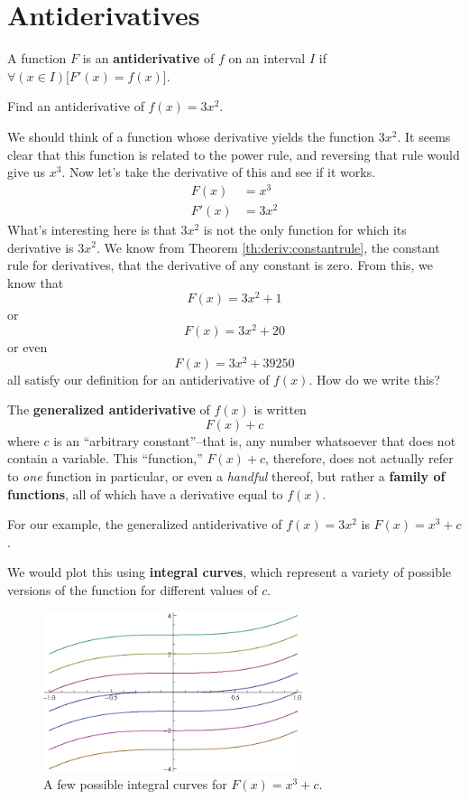 \section{Antiderivatives}
\begin{defn}
  A function $F$ is an \textbf{antiderivative} of $f$ on an interval $I$ if $\forall (x \in I) \big[F'(x)=f(x)\big]$.
\end{defn}
\begin{ex}
  Find an antiderivative of $f(x)=3x^2$.
  \begin{sol}
    We should think of a function whose derivative yields the function $3x^2$.
    It seems clear that this function is related to the power rule, and reversing that rule would give us $x^3$.
    Now let's take the derivative of this and see if it works.
    \begin{align*}
      F(x)&=x^3 \\
      F'(x) &= 3x^2
    \end{align*}
    What's interesting here is that $3x^2$ is not the only function for which its derivative is $3x^2$.
    We know from Theorem \ref{th:deriv:constantrule}, the constant rule for derivatives, that the derivative of any constant is zero.
    From this, we know that
    \[ F(x)=3x^2+1 \]
    or
    \[ F(x)=3x^2+20\]
    or even
    \[ F(x)=3x^2+39250\]
    all satisfy our definition for an antiderivative of $f(x)$.
    How do we write this?

    The \textbf{generalized antiderivative} of $f(x)$ is written
    \[ F(x)+c \]
    where $c$ is an ``arbitrary constant''--that is, any number whatsoever that does not contain a variable.
    This ``function,'' $F(x)+c$, therefore, does not actually refer to \emph{one} function in particular,
    or even a \emph{handful} thereof, but rather a \textbf{family of functions}, all of which have a derivative equal to $f(x)$.

    For our example, the generalized antiderivative of $f(x)=3x^2$ is $F(x)=x^3+c$.
  \end{sol}
\end{ex}
We would plot this using \textbf{integral curves}, which represent a variety of possible versions of the function for different values of $c$.
\begin{figure}[<+htpb+>]
  \begin{center}
    \includegraphics[width=3in]{continuous/derivatives/intcurves.eps}
  \end{center}
  \caption{A few possible integral curves for $F(x)=x^3+c$.}
\end{figure}
